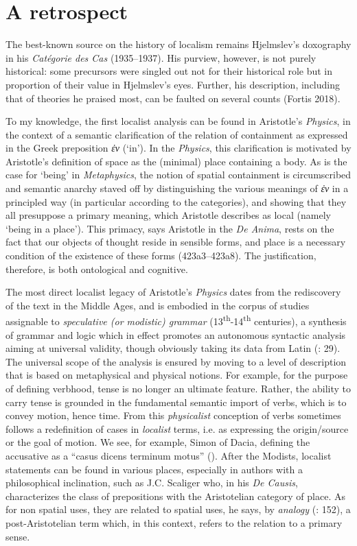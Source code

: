 \documentclass[output=paper]{langscibook}
\begin{document}
\section{A retrospect}
The best-known source on the history of localism remains Hjelmslev’s doxography in his \textit{Catégorie des Cas} (1935--1937). His purview, however, is not purely historical: some precursors were singled out not for their historical role but in proportion of their value in Hjelmslev’s eyes. Further, his description, including that of theories he praised most, can be faulted on several counts (Fortis 2018). 

To my knowledge, the first localist analysis can be found in Aristotle’s \textit{Physics}, in the context of a semantic clarification of the relation of containment as expressed in the Greek preposition \textit{ἐν} (‘in’). In the \textit{Physics}, this clarification is motivated by Aristotle’s definition of space as the (minimal) place containing a body. As is the case for ‘being’ in \textit{Metaphysics}, the notion of spatial containment is circumscribed and semantic anarchy staved off by distinguishing the various meanings of \textit{ἐν} in a principled way (in particular according to the categories), and showing that they all presuppose a primary meaning, which Aristotle describes as local (namely ‘being in a place’). This primacy, says Aristotle in the \textit{De Anima}, rests on the fact that our objects of thought reside in sensible forms, and place is a necessary condition of the existence of these forms (423a3--423a8). The justification, therefore, is both ontological and cognitive.

The most direct localist legacy of Aristotle’s \textit{Physics} dates from the rediscovery of the text in the Middle Ages, and is embodied in the corpus of studies assignable to \textit{speculative (or modistic) grammar }(13\textsuperscript{th}{}-14\textsuperscript{th} centuries), a synthesis of grammar and logic which in effect promotes an autonomous syntactic analysis aiming at universal validity, though obviously taking its data from Latin (\citealt{bursill-hall_speculative_1971}: 29). The universal scope of the analysis is ensured by moving to a level of description that is based on metaphysical and physical notions. For example, for the purpose of defining verbhood, tense is no longer an ultimate feature. Rather, the ability to carry tense is grounded in the fundamental semantic import of verbs, which is to convey motion, hence time. From this \textit{physicalist} conception of verbs sometimes follows a redefinition of cases in \textit{localist} terms, i.e. as expressing the origin\slash source or the goal of motion. We see, for example, Simon of Dacia, defining the accusative as a “casus dicens terminum motus” (\citealt{joly_physique_1977}). After the Modists, localist statements can be found in various places, especially in authors with a philosophical inclination, such as J.C. Scaliger who, in his \textit{De Causis}, characterizes the class of prepositions with the Aristotelian category of place. As for non spatial uses, they are related to spatial uses, he says, by \textit{analogy} (\citeyear{scaliger_causis_2018}: 152), a post-Aristotelian term which, in this context, refers to the relation to a primary sense.
\end{document}
